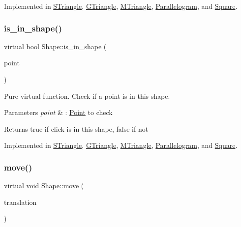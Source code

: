 Implemented in \hyperlink{classSTriangle_a08f667453619b506b5c16745a9aa5ecf}{S\+Triangle}, \hyperlink{classGTriangle_add4581d1b52836142de5817de4d52d17}{G\+Triangle}, \hyperlink{classMTriangle_a90351a097a20d35f9d6c4d05ad881e48}{M\+Triangle}, \hyperlink{classParallelogram_a17c9986712806a8b07d90e444e0a543d}{Parallelogram}, and \hyperlink{classSquare_a2a8fb1bfd2f3464cee813ec8b277506e}{Square}.

\mbox{\label{classShape_aa09a621da090e42840b4bec7ffb27620}} 
\subsubsection{\texorpdfstring{is\+\_\+in\+\_\+shape()}{is\_in\_shape()}}
{\footnotesize\ttfamily virtual bool Shape\+::is\+\_\+in\+\_\+shape (\begin{DoxyParamCaption}\item[{const \hyperlink{classPoint}{Point}$<$ double $>$ \&}]{point }\end{DoxyParamCaption})\hspace{0.3cm}{\ttfamily [pure virtual]}}



Pure virtual function. Check if a point is in this shape. 


\begin{DoxyParams}{Parameters}
{\em point} & \+: \hyperlink{classPoint}{Point} to check \\
\hline
\end{DoxyParams}
\begin{DoxyReturn}{Returns}
true if click is in this shape, false if not 
\end{DoxyReturn}


Implemented in \hyperlink{classSTriangle_a5b55df6eb4af922521da69f69df77b42}{S\+Triangle}, \hyperlink{classGTriangle_abb6f7243155483cc6de301931e87475a}{G\+Triangle}, \hyperlink{classMTriangle_a4cc4cd63537ead67a0b68d1ab25111b4}{M\+Triangle}, \hyperlink{classParallelogram_a585b14ca0f65ed3a5007e8c1df3c6bc4}{Parallelogram}, and \hyperlink{classSquare_ada046df2d9fb92286d106d4b3475980a}{Square}.

\mbox{\label{classShape_a1f447acd6219cb10b9b7a40371519c46}} 
\subsubsection{\texorpdfstring{move()}{move()}}
{\footnotesize\ttfamily virtual void Shape\+::move (\begin{DoxyParamCaption}\item[{const \hyperlink{classPoint}{Point}$<$ double $>$ \&}]{translation }\end{DoxyParamCaption})\hspace{0.3cm}{\ttfamily [pure virtual]}}



